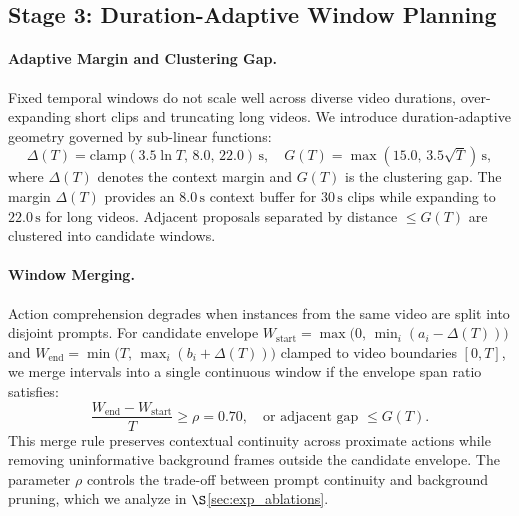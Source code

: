 
\subsection{Stage 3: Duration-Adaptive Window Planning}
\label{sec:stage3}

\paragraph{Adaptive Margin and Clustering Gap.} Fixed temporal windows do not scale well across diverse video durations, over-expanding short clips and truncating long videos. We introduce duration-adaptive geometry governed by sub-linear functions:
\begin{equation}
    \Delta(T) = \mathrm{clamp}(3.5 \ln T, \, 8.0, \, 22.0)\,\mathrm{s}, \quad G(T) = \max(15.0, \, 3.5\sqrt{T})\,\mathrm{s},
    \label{eq:adaptive_geometry}
\end{equation}
where $\Delta(T)$ denotes the context margin and $G(T)$ is the clustering gap. The margin $\Delta(T)$ provides an $8.0\,\mathrm{s}$ context buffer for $30\,\mathrm{s}$ clips while expanding to $22.0\,\mathrm{s}$ for long videos. Adjacent proposals separated by distance $\le G(T)$ are clustered into candidate windows.

\paragraph{Window Merging.} Action comprehension degrades when instances from the same video are split into disjoint prompts. For candidate envelope $W_{\text{start}} = \max\big(0, \, \min_i (a_i - \Delta(T))\big)$ and $W_{\text{end}} = \min\big(T, \, \max_i (b_i + \Delta(T))\big)$ clamped to video boundaries $[0, T]$, we merge intervals into a single continuous window if the envelope span ratio satisfies:
\begin{equation}
    \frac{W_{\text{end}} - W_{\text{start}}}{T} \ge \rho = 0.70, \quad \text{or adjacent gap } \le G(T).
    \label{eq:soft_merge}
\end{equation}
This merge rule preserves contextual continuity across proximate actions while removing uninformative background frames outside the candidate envelope. The parameter $\rho$ controls the trade-off between prompt continuity and background pruning, which we analyze in $\S$\ref{sec:exp_ablations}.


